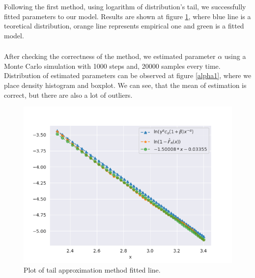 \documentclass{article}
\begin{document}
		Following the first method, using logarithm of distribution's tail, we successfully fitted parameters to our model.
		Results are shown at figure \ref{tails1}, where blue line is a teoretical distribution, orange line represents empirical one and green is a fitted model.
		\subsubsection{}
        After checking the correctness of the method, we estimated parameter $\alpha$ using a Monte Carlo simulation with 1000 steps and, 20000 samples every time.
		Distribution of estimated parameters can be observed at figure \ref{alpha1}, where we place density histogram and boxplot.
		We can see, that the mean of estimation is correct, but there are also a lot of outliers.		 
		
		\begin{figure}[H]
			\centering
			\includegraphics[width=1\linewidth]{images/compare_cdf_plots_type_1.png}
			\caption{Plot of tail approximation method fitted line.}\label{tails1}
		\end{figure}
\end{document}
